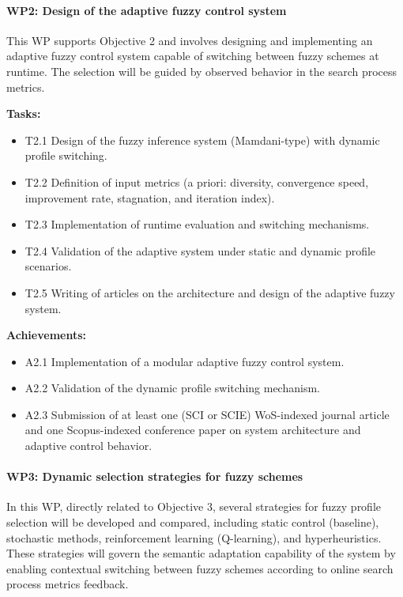\paragraph{WP2: Design of the adaptive fuzzy control system}
This WP supports Objective 2 and involves designing and implementing an adaptive fuzzy control system capable of switching between fuzzy schemes at runtime. The selection will be guided by observed behavior in the search process metrics.

\textbf{Tasks:}
\begin{itemize}
    \item T2.1 Design of the fuzzy inference system (Mamdani-type) with dynamic profile switching.
    \item T2.2 Definition of input metrics (a priori: diversity, convergence speed, improvement rate, stagnation, and iteration index).
    \item T2.3 Implementation of runtime evaluation and switching mechanisms.
    \item T2.4 Validation of the adaptive system under static and dynamic profile scenarios.
    \item T2.5 Writing of articles on the architecture and design of the adaptive fuzzy system.
\end{itemize}

\textbf{Achievements:}
\begin{itemize}
    \item A2.1 Implementation of a modular adaptive fuzzy control system.
    \item A2.2 Validation of the dynamic profile switching mechanism.
    \item A2.3 Submission of at least one (SCI or SCIE) WoS-indexed journal article and one Scopus-indexed conference paper on system architecture and adaptive control behavior.
\end{itemize}

\paragraph{WP3: Dynamic selection strategies for fuzzy schemes}
In this WP, directly related to Objective 3, several strategies for fuzzy profile selection will be developed and compared, including static control (baseline), stochastic methods, reinforcement learning (Q-learning), and hyperheuristics. These strategies will govern the semantic adaptation capability of the system by enabling contextual switching between fuzzy schemes according to online search process metrics feedback.

